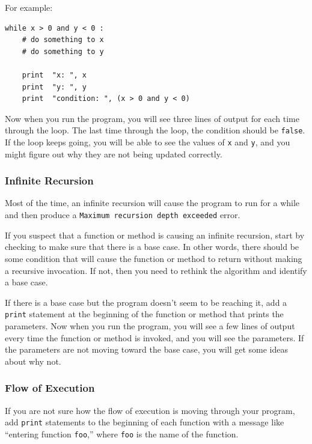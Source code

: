 \documentclass[10pt]{book}
\begin{document}
{For example:

\beforeverb
\begin{verbatim}
while x > 0 and y < 0 :
    # do something to x
    # do something to y

    print  "x: ", x
    print  "y: ", y
    print  "condition: ", (x > 0 and y < 0)
\end{verbatim}
\afterverb
%
Now when you run the program, you will see three lines of output
for each time through the loop.  The last time through the
loop, the condition should be {\tt false}.  If the loop keeps
going, you will be able to see the values of {\tt x} and {\tt y},
and you might figure out why they are not being updated correctly.


\subsubsection{Infinite Recursion}

Most of the time, an infinite recursion will cause the program to run
for a while and then produce a {\tt Maximum recursion depth exceeded}
error.

If you suspect that a function or method is causing an infinite
recursion, start by checking to make sure that there is a base case.
In other words, there should be some condition that will cause the
function or method to return without making a recursive invocation.
If not, then you need to rethink the algorithm and identify a base
case.

If there is a base case but the program doesn't seem to be reaching
it, add a {\tt print} statement at the beginning of the function or method
that prints the parameters.  Now when you run the program, you will see
a few lines of output every time the function or method is invoked,
and you will see the parameters.  If the parameters are not moving
toward the base case, you will get some ideas about why not.


\subsubsection{Flow of Execution}

If you are not sure how the flow of execution is moving through
your program, add {\tt print} statements to the beginning of each
function with a message like ``entering function {\tt foo},'' where
{\tt foo} is the name of the function.

}
\end{document}
